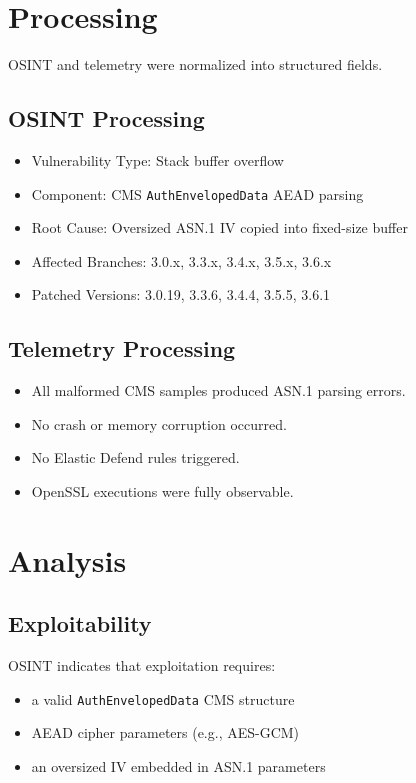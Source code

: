 \documentclass[12pt]{article}
\begin{document}
\section{Processing}

OSINT and telemetry were normalized into structured fields.

\subsection*{OSINT Processing}
\begin{itemize}
    \item Vulnerability Type: Stack buffer overflow
    \item Component: CMS \texttt{AuthEnvelopedData} AEAD parsing
    \item Root Cause: Oversized ASN.1 IV copied into fixed-size buffer
    \item Affected Branches: 3.0.x, 3.3.x, 3.4.x, 3.5.x, 3.6.x
    \item Patched Versions: 3.0.19, 3.3.6, 3.4.4, 3.5.5, 3.6.1
\end{itemize}

\subsection*{Telemetry Processing}
\begin{itemize}
    \item All malformed CMS samples produced ASN.1 parsing errors.
    \item No crash or memory corruption occurred.
    \item No Elastic Defend rules triggered.
    \item OpenSSL executions were fully observable.
\end{itemize}

\section{Analysis}

\subsection*{Exploitability}
OSINT indicates that exploitation requires:
\begin{itemize}
    \item a valid \texttt{AuthEnvelopedData} CMS structure
    \item AEAD cipher parameters (e.g., AES-GCM)
    \item an oversized IV embedded in ASN.1 parameters
\end{itemize}
\end{document}
